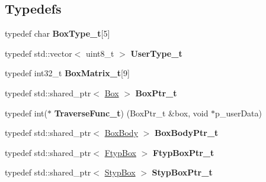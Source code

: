 \subsection*{Typedefs}
\begin{DoxyCompactItemize}
\item 
\mbox{\label{namespacemp4_parser_a45522ceeeeb8b239314b9f815392768e}} 
typedef char {\bfseries Box\+Type\+\_\+t}\mbox{[}5\mbox{]}
\item 
\mbox{\label{namespacemp4_parser_a22bbf97180b8c8a83e73c866f2f1cdf1}} 
typedef std\+::vector$<$ uint8\+\_\+t $>$ {\bfseries User\+Type\+\_\+t}
\item 
\mbox{\label{namespacemp4_parser_aa52b9f10faa98e7029b4ab5b5ec76681}} 
typedef int32\+\_\+t {\bfseries Box\+Matrix\+\_\+t}\mbox{[}9\mbox{]}
\item 
\mbox{\label{namespacemp4_parser_af5f9d42e22fd0cdd44c61d435b140329}} 
typedef std\+::shared\+\_\+ptr$<$ \mbox{\hyperlink{classmp4_parser_1_1_box}{Box}} $>$ {\bfseries Box\+Ptr\+\_\+t}
\item 
\mbox{\label{namespacemp4_parser_a4b4ce83300d9167c07616e9e3eaecd5d}} 
typedef int($\ast$ {\bfseries Traverse\+Func\+\_\+t}) (Box\+Ptr\+\_\+t \&box, void $\ast$p\+\_\+user\+Data)
\item 
\mbox{\label{namespacemp4_parser_a1f8b096edd8f2758c0fa103e1c4099b9}} 
typedef std\+::shared\+\_\+ptr$<$ \mbox{\hyperlink{structmp4_parser_1_1_box_body}{Box\+Body}} $>$ {\bfseries Box\+Body\+Ptr\+\_\+t}
\item 
\mbox{\label{namespacemp4_parser_aef07aec389019428947b59abc3ce319c}} 
typedef std\+::shared\+\_\+ptr$<$ \mbox{\hyperlink{classmp4_parser_1_1_ftyp_box}{Ftyp\+Box}} $>$ {\bfseries Ftyp\+Box\+Ptr\+\_\+t}
\item 
\mbox{\label{namespacemp4_parser_a537a54d361ee3b4742b8e7c1848ef7cc}} 
typedef std\+::shared\+\_\+ptr$<$ \mbox{\hyperlink{classmp4_parser_1_1_styp_box}{Styp\+Box}} $>$ {\bfseries Styp\+Box\+Ptr\+\_\+t}
\item 
\mbox{\label{namespacemp4_parser_a2385cad44c4e60a7b51cdc210505c3f9}} 

\end{DoxyCompactItemize}

